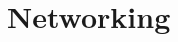 \documentclass[../main.tex]{subfiles}
\begin{document}
	\chapter{Networking}\label{ch:networking}
	
\end{document}
